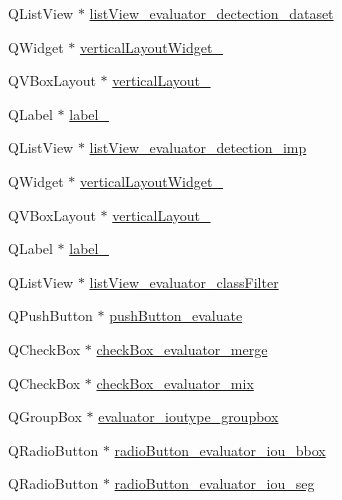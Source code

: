 \begin{DoxyCompactItemize}
\item 
Q\+List\+View $\ast$ \hyperlink{class_ui___main_window_ad406b1ccc099d16a88c252beea941c01}{list\+View\+\_\+evaluator\+\_\+dectection\+\_\+dataset}
\item 
Q\+Widget $\ast$ \hyperlink{class_ui___main_window_a67f303e65472fcb75e35804799985009}{vertical\+Layout\+Widget\+\_}
\item 
Q\+V\+Box\+Layout $\ast$ \hyperlink{class_ui___main_window_ae5f4dafa4f99b3990c864f0bc54cc87d}{vertical\+Layout\+\_}
\item 
Q\+Label $\ast$ \hyperlink{class_ui___main_window_a55100f53189f25cf8a1ee0beb29be642}{label\+\_}
\item 
Q\+List\+View $\ast$ \hyperlink{class_ui___main_window_a01100beb3f7e7c8acaf9e10443b87b85}{list\+View\+\_\+evaluator\+\_\+detection\+\_\+imp}
\item 
Q\+Widget $\ast$ \hyperlink{class_ui___main_window_a39cb3adb4dc8688e65d3b10496a9d603}{vertical\+Layout\+Widget\+\_}
\item 
Q\+V\+Box\+Layout $\ast$ \hyperlink{class_ui___main_window_a2e443acea8dcdda2848b1ab2daf3876e}{vertical\+Layout\+\_}
\item 
Q\+Label $\ast$ \hyperlink{class_ui___main_window_ad0a5580e9e7432ed041d6c2d587cd13e}{label\+\_}
\item 
Q\+List\+View $\ast$ \hyperlink{class_ui___main_window_a866370f94029bb74094485bd673c7efe}{list\+View\+\_\+evaluator\+\_\+class\+Filter}
\item 
Q\+Push\+Button $\ast$ \hyperlink{class_ui___main_window_a2204a95e5d48dee0ca4934bb92ae5f0d}{push\+Button\+\_\+evaluate}
\item 
Q\+Check\+Box $\ast$ \hyperlink{class_ui___main_window_ae3c8fcea7a8729ef0a17909bc37a3dde}{check\+Box\+\_\+evaluator\+\_\+merge}
\item 
Q\+Check\+Box $\ast$ \hyperlink{class_ui___main_window_a7d888872d1bc798c9b3ddcfb71391a39}{check\+Box\+\_\+evaluator\+\_\+mix}
\item 
Q\+Group\+Box $\ast$ \hyperlink{class_ui___main_window_a294eadb4573e9251e10d1c2e9f1d720e}{evaluator\+\_\+ioutype\+\_\+groupbox}
\item 
Q\+Radio\+Button $\ast$ \hyperlink{class_ui___main_window_a328b56158a5791610c2a21a36613b14a}{radio\+Button\+\_\+evaluator\+\_\+iou\+\_\+bbox}
\item 
Q\+Radio\+Button $\ast$ \hyperlink{class_ui___main_window_aa00c3f0a531c3ccc3393e3209c62af6c}{radio\+Button\+\_\+evaluator\+\_\+iou\+\_\+seg}
\item 

\end{DoxyCompactItemize}
